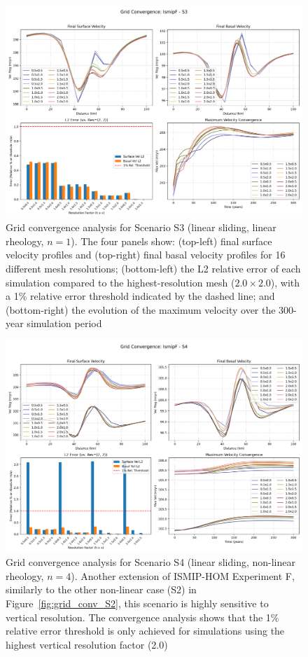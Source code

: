 \begin{figure}[H]
    \includegraphics[scale=0.40]{figures/IsmipF_S3_convergence_summary.png}
    \caption{Grid convergence analysis for Scenario S3 (linear sliding, linear rheology, $n=1$). The four panels show: (top-left) final surface velocity profiles and (top-right) final basal velocity profiles for 16 different mesh resolutions; (bottom-left) the L2 relative error of each simulation compared to the highest-resolution mesh ($2.0\times2.0$), with a 1\% relative error threshold indicated by the dashed line; and (bottom-right) the evolution of the maximum velocity over the 300-year simulation period}
    \label{fig:grid_conv_S3}
\end{figure}
\begin{figure}[H]
    \includegraphics[scale=0.40]{figures/IsmipF_S4_convergence_summary.png}
    \caption{Grid convergence analysis for Scenario S4 (linear sliding, non-linear rheology, $n=4$). Another extension of ISMIP-HOM Experiment F, similarly to the other non-linear case (S2) in Figure~\ref{fig:grid_conv_S2}, this scenario is highly sensitive to vertical resolution.  The convergence analysis shows that the 1\% relative error threshold is only achieved for simulations using the highest vertical resolution factor (2.0)}
    \label{fig:grid_conv_S4}
\end{figure}
